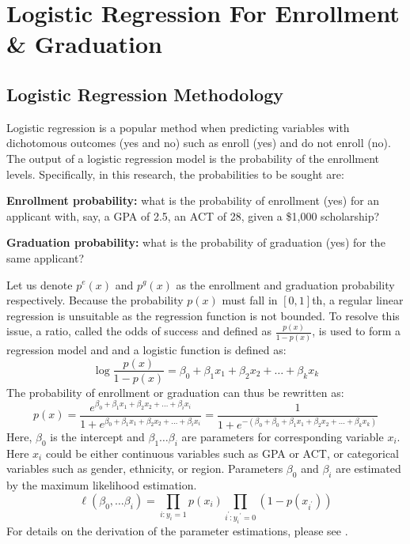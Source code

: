 \documentclass[12pt,english]{report}
\begin{document}
\newpage
\section{Logistic Regression For Enrollment \& Graduation}
\subsection{Logistic Regression Methodology}

Logistic regression is a popular method when predicting variables with dichotomous outcomes (yes and no) such as enroll (yes) and do not enroll (no). The output of a logistic regression model is the probability of the enrollment levels. Specifically, in this research, the probabilities to be sought are:

\noindent \textbf{Enrollment probability:} what is the probability of enrollment (yes) for an applicant with, say, a GPA of 2.5, an ACT of 28, given a \$1,000 scholarship?

\noindent \textbf{Graduation probability:} what is the probability of graduation (yes) for the same applicant?

\vspace{0.15in}
Let us denote $p^e(x)$ and $p^g(x)$ as the enrollment and graduation probability respectively. Because the probability $p(x)$ must fall in $[0,1]$th, a regular linear regression is unsuitable as the regression function is not bounded. To resolve this issue, a ratio, called the odds of success and defined as  $\frac{p(x)}{1-p(x)}$,  is used to form a regression model and and a logistic function is defined as:
\begin{equation}
\ensuremath{\log\frac{p(x)}{1-p(x)}=\beta_0+\beta_1 x_1+\beta_2 x_2 +\ldots+\beta_k x_k}
\end{equation}
The probability of enrollment or graduation can thus be rewritten as:
\begin{equation}
p(x)=\frac{e^{\beta_0+\beta_1 x_1+\beta_2 x_2 +\ldots+\beta_i x_i}}{1+e^{\beta_0+\beta_1 x_1+\beta_2 x_2 +\ldots+\beta_ix_i}}
=\frac{1}{1+e^{-(\beta_0+\beta_0+\beta_1 x_1+\beta_2 x_2 +\ldots+\beta_k x_k)}}
\end{equation}
Here, $\beta_0$ is the intercept and $\beta_1 \ldots \beta_i$ are parameters for corresponding variable $x_i$.  Here $x_i$ could be either continuous
variables such as GPA or  ACT, or categorical variables such as gender, ethnicity, or region.  Parameters $\beta_0$ and $\beta_i$ are estimated by the maximum likelihood estimation.
\begin{equation}
\ell(\beta_0,\ldots \beta_i) = \prod_{i:y_i=1} p(x_i)
\prod_{i^{'}:y_i{^{'}=0}} (1-p(x_{i^{'}}))
\end{equation}
For details on the derivation of the parameter estimations, please see \citet{Hosmer2013}.
\end{document}
